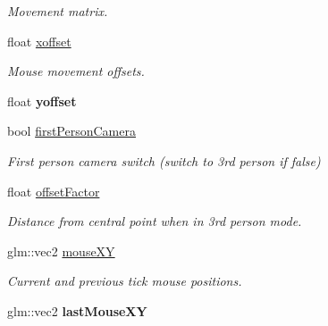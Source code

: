 \begin{DoxyCompactItemize}
\begin{DoxyCompactList}\small\item\em Movement matrix. \end{DoxyCompactList}\item 
\hypertarget{class_camera_component_a385f35e4c5d616580e0bd4ded5c4653f}{float \hyperlink{class_camera_component_a385f35e4c5d616580e0bd4ded5c4653f}{xoffset}}\label{class_camera_component_a385f35e4c5d616580e0bd4ded5c4653f}

\begin{DoxyCompactList}\small\item\em Mouse movement offsets. \end{DoxyCompactList}\item 
\hypertarget{class_camera_component_aac7aad40b74b70920b8b5d214550fe91}{float {\bfseries yoffset}}\label{class_camera_component_aac7aad40b74b70920b8b5d214550fe91}

\item 
\hypertarget{class_camera_component_ac1d3fbcc4d2d4a0f079339a238798cd8}{bool \hyperlink{class_camera_component_ac1d3fbcc4d2d4a0f079339a238798cd8}{first\+Person\+Camera}}\label{class_camera_component_ac1d3fbcc4d2d4a0f079339a238798cd8}

\begin{DoxyCompactList}\small\item\em First person camera switch (switch to 3rd person if false) \end{DoxyCompactList}\item 
\hypertarget{class_camera_component_a8d1632f720f6478ceb2c146aee4a35b1}{float \hyperlink{class_camera_component_a8d1632f720f6478ceb2c146aee4a35b1}{offset\+Factor}}\label{class_camera_component_a8d1632f720f6478ceb2c146aee4a35b1}

\begin{DoxyCompactList}\small\item\em Distance from central point when in 3rd person mode. \end{DoxyCompactList}\item 
\hypertarget{class_camera_component_a92d8a306e8b05c1bde2deecb4ae5e1f9}{glm\+::vec2 \hyperlink{class_camera_component_a92d8a306e8b05c1bde2deecb4ae5e1f9}{mouse\+X\+Y}}\label{class_camera_component_a92d8a306e8b05c1bde2deecb4ae5e1f9}

\begin{DoxyCompactList}\small\item\em Current and previous tick mouse positions. \end{DoxyCompactList}\item 
\hypertarget{class_camera_component_aef5b26e5e9b68eab4efec97b74c11b13}{glm\+::vec2 {\bfseries last\+Mouse\+X\+Y}}\label{class_camera_component_aef5b26e5e9b68eab4efec97b74c11b13}


\end{DoxyCompactItemize}
